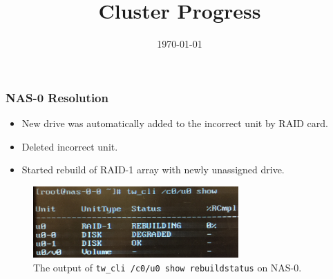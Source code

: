 \documentclass{beamer}
\title{Cluster Progress}
\date{\today}
\begin{document}

\begin{frame}
  \maketitle
\end{frame}



\begin{frame}

  \frametitle{NAS-0 Resolution}

  \begin{itemize}
    \item New drive was automatically added to the incorrect unit by RAID card.
    \item Deleted incorrect unit.
    \item Started rebuild of RAID-1 array with newly unassigned drive.
  \end{itemize}

  \begin{figure}[H]
    \begin{center}
      \includegraphics[width=0.7\textwidth]{nas0rebuild.jpg}
    \end{center}
    \caption{The output of {\tt tw\_cli /c0/u0 show rebuildstatus} on NAS-0.}
  \end{figure}

\end{frame}


\end{document}
